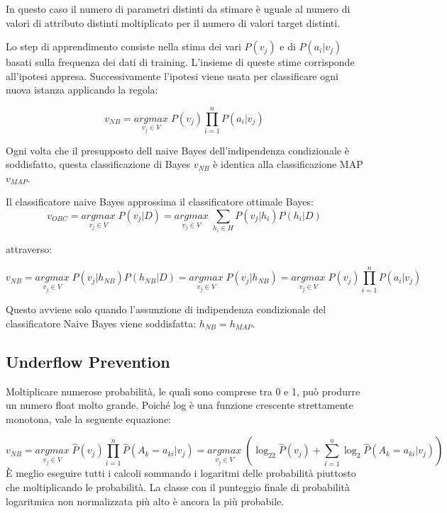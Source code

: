 \documentclass[a4paper]{extarticle}
\begin{document}
In questo caso il numero di parametri distinti da stimare è uguale al numero di valori di attributo distinti moltiplicato per il numero di valori target distinti.

Lo step di apprendimento consiste nella stima dei vari $P(v_j)$ e di $P(a_i|v_j)$ basati sulla frequenza dei dati di training. L'insieme di queste stime corrisponde all'ipotesi appresa. Successivamente l'ipotesi viene usata per classificare ogni nuova istanza applicando la regola:

\begin{equation*}
v_{NB} = \underset{v_j\in V}{argmax} \; P(v_j) \prod_{i=1}^n P(a_i|v_j)
\end{equation*}

Ogni volta che il presupposto dell naive Bayes dell'indipendenza condizionale è soddisfatto, questa classificazione di Bayes $v_{NB}$ è identica alla classificazione MAP $v_{MAP}$.

Il classificatore naive Bayes approssima il classificatore ottimale Bayes:
\begin{equation*}
v_{OBC} = \underset{v_j\in V}{argmax} \; P(v_j | D) = \underset{v_j\in V}{argmax} \; \sum\limits_{h_i \in H} P(v_j | h_i) P(h_i|D)
\end{equation*}

attraverso: 

\begin{equation*}
v_{NB} = \underset{v_j\in V}{argmax} \; P(v_j | h_{NB})P(h_{NB} | D) = \underset{v_j\in V}{argmax} \; P(v_j | h_{NB}) = \underset{v_j\in V}{argmax} \; P(v_j)  \prod_{i=1}^n P(a_i | v_j)
\end{equation*}

Questo avviene solo  quando l'assunzione di indipendenza condizionale del classificatore Naive Bayes viene soddisfatta: $h_{NB} = h_{MAP}$. 

\subsection{Underflow Prevention}
Moltiplicare numerose probabilità, le quali sono comprese tra 0 e 1, può produrre un numero float molto grande. Poiché log è una funzione crescente strettamente monotona, vale la seguente equazione:

\begin{equation*}
v_{NB} = \underset{v_j\in V}{argmax} \; \hat P (v_j) \prod_{i=1}^n \hat P (A_k = a_{ki} | v_j) = \underset{v_j\in V}{argmax} \; (\log_22 \hat P(v_j) + \sum\limits_{i=1}^n \log_2 \hat P (A_k = a_{ki} | v_j))
\end{equation*}
È meglio eseguire tutti i calcoli sommando i logaritmi delle probabilità piuttosto che moltiplicando le probabilità. La classe con il punteggio finale di probabilità logaritmica non normalizzata più alto è ancora la più probabile.
\end{document}
